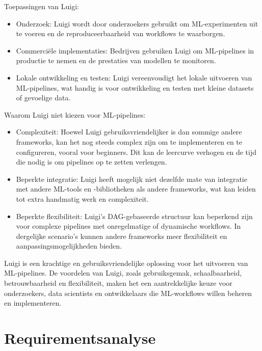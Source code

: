 Toepassingen van Luigi:

\begin{itemize}
  \item Onderzoek: Luigi wordt door onderzoekers gebruikt om ML-experimenten uit te voeren en de reproduceerbaarheid van workflows te waarborgen.
  \item Commerciële implementaties: Bedrijven gebruiken Luigi om ML-pipelines in productie te nemen en de prestaties van modellen te monitoren.
  \item Lokale ontwikkeling en testen: Luigi vereenvoudigt het lokale uitvoeren van ML-pipelines, wat handig is voor ontwikkeling en testen met kleine datasets of gevoelige data.
\end{itemize}

Waarom Luigi niet kiezen voor ML-pipelines:
\begin{itemize}
    \item Complexiteit: Hoewel Luigi gebruiksvriendelijker is dan sommige andere frameworks, kan het nog steeds complex zijn om te implementeren en te configureren, vooral voor beginners. Dit kan de leercurve verhogen en de tijd die nodig is om pipelines op te zetten verlengen.
    \item Beperkte integratie: Luigi heeft mogelijk niet dezelfde mate van integratie met andere ML-tools en -bibliotheken als andere frameworks, wat kan leiden tot extra handmatig werk en complexiteit.
    \item Beperkte flexibiliteit: Luigi's DAG-gebaseerde structuur kan beperkend zijn voor complexe pipelines met onregelmatige of dynamische workflows. In dergelijke scenario's kunnen andere frameworks meer flexibiliteit en aanpassingsmogelijkheden bieden.
  \end{itemize}

Luigi is een krachtige en gebruiksvriendelijke oplossing voor het uitvoeren van ML-pipelines. De voordelen van Luigi, zoals gebruiksgemak, schaalbaarheid, betrouwbaarheid en flexibiliteit, maken het een aantrekkelijke keuze voor onderzoekers, data scientists en ontwikkelaars die ML-workflows willen beheren en implementeren.



\section{Requirementsanalyse}

